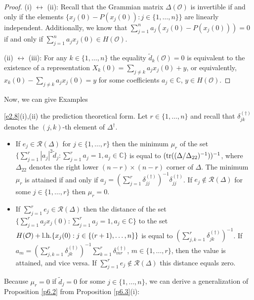 \documentclass{amsart}
\begin{document}
\begin{proof}
(i) $\leftrightarrow$ (ii): Recall that the Grammian matrix $\Delta({\mathcal O})$ is invertible if and only if the elements $\{ x_j(0)-{P}(x_j(0)) : j \in \{ 1,\ldots,n \} \}$ are linearly independent. Additionally, we know that $\sum_{j=1}^n a_j (x_j(0) - {P}(x_j(0))) = 0$ if and only if $\sum_{j=1}^n a_j x_j(0) \in H({\mathcal O})$.

(ii) $\leftrightarrow$ (iii): For any $k \in \{ 1,\ldots,n \}$ the equality $\tilde{d}_k({\mathcal O})=0$ is equivalent to the existence of a representation  $X_k(0) = \sum_{j \not=k} a_jx_j(0) +y$, or equivalently, $x_k(0)-\sum_{j \not=k} a_jx_j(0) = y$ for some coefficients $a_j \in {\mathbb C}$, $y \in H({\mathcal O})$. 
\end{proof}          

Now, we can give Examples {\ref{e2.8}(i),(ii) the prediction theoretical form. Let $r \in \{ 1,\ldots,n \}$ and recall that $\delta_{jk}^{(\dagger)}$ denotes the $(j,k)$-th element of $\Delta^\dagger$. 

\begin{pro} \label{p6.3}
\begin{itemize}
    \item[(i)]   If $e_j \in {\mathcal R}(\Delta)$ for $j \in \{ 1,\ldots,r \}$ then the minimum $\mu_r$ of the set  $\{ \sum_{j=1}^r | a_j|^2 \tilde{d}_j : \sum_{j=1}^r a_j=1, a_j \in {\mathbb C} \}$ is equal to $({\rm tr}((\Delta / \Delta_{22})^{-1}))^{-1}$, where $\Delta_{22}$ denotes the right lower $(n-r) \times (n-r)$ corner of $\Delta$. The minimum $\mu_r$ is attained if and only if $a_j=(\sum_{j=1}^r \delta_{jj}^{(\dagger)} )^{-1}\delta_{jj}^{(\dagger)}$. If $e_j \not\in {\mathcal R}(\Delta)$ for some $j \in \{ 1,\ldots,r \}$ then $\mu_r=0$. 
    \item[(ii)]    If $\sum_{j=1}^r e_j \in {\mathcal R}(\Delta)$ then the distance of the set $\{ \sum_{j=1}^r a_j x_j(0) : \sum_{j=1}^r a_j = 1, a_j \in {\mathbb C} \}$ to the set $H({\mathcal O}) + {\rm l.h.} \{ x_j(0) : j \in \{ (r+1),\ldots,n \} \}$ is equal to $(\sum_{j,k=1}^r \delta_{jk}^{(\dagger)})^{-1}$. If $a_m = (\sum_{j,k =1}^r \delta_{jk}^{(\dagger)} )^{-1} \sum_{k=1}^r \delta_{mr}^{(\dagger)}$, $m \in \{ 1,\ldots,r \}$, then the value is attained, and vice versa. If $\sum_{j=1}^r e_j \not\in {\mathcal R}(\Delta)$ this distance equals zero. 
\end{itemize}    
\end{pro}

Because $\mu_r=0$ if $\tilde{d}_j=0$ for some $j \in \{ 1,\ldots,n \}$, we can derive a generalization of Proposition \ref{p6.2} from Proposition \ref{p6.3}(i): 

}
\end{document}
